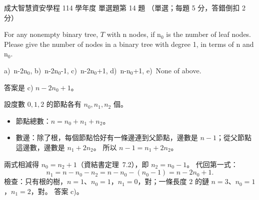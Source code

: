 \begin{pastexam}[label={px:ncku-114-isec-ds-14}]{成大智慧資安學程 114 學年度 單選題第 14 題}
（單選；每題 5 分，答錯倒扣 2 分）

For any nonempty binary tree, $T$ with n nodes, if n$_0$ is the number of leaf nodes. Please give the
number of nodes in a binary tree with degree 1, in terms of n and n$_0$.

a)~n-2n$_0$, \qquad b)~n-2n$_0$-1, \qquad c)~n-2n$_0$+1, \qquad d)~n-n$_0$+1, \qquad e)~None of above.
\end{pastexam}

\begin{pastsoln}
答案是 c) $n - 2n_0 + 1$。

設度數 $0, 1, 2$ 的節點各有 $n_0, n_1, n_2$ 個。
\begin{itemize}
\item 節點總數：$n = n_0 + n_1 + n_2$。
\item 數邊：除了根，每個節點恰好有一條邊連到父節點，邊數是 $n - 1$；從父節點這邊數，邊數是
$n_1 + 2n_2$。 所以 $n - 1 = n_1 + 2n_2$。
\end{itemize}
兩式相減得 $n_0 = n_2 + 1$（資結書定理~7.2），即 $n_2 = n_0 - 1$。 代回第一式：
\[
n_1 = n - n_0 - n_2 = n - n_0 - (n_0 - 1) = n - 2n_0 + 1 .
\]
檢查：只有根的樹，$n = 1$、$n_0 = 1$，$n_1 = 0$，對；一條長度 $2$ 的鏈 $n = 3$、$n_0 = 1$，$n_1 = 2$，對。
答案 c)。
\end{pastsoln}
